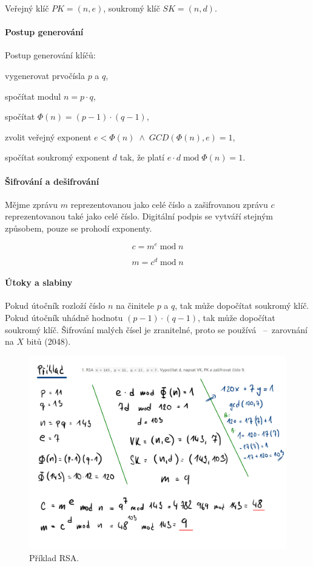 \noindent Veřejný klíč $PK = (n, e)$, soukromý klíč $SK = (n, d)$.

\paragraph*{Postup generování} Postup generování klíčů: \begin{compactenum}
    \item vygenerovat prvočísla $p$ a $q$,
    \item spočítat modul $n = p \cdot q$,
    \item spočítat $\Phi(n) = (p-1) \cdot (q-1)$,
    \item zvolit veřejný exponent $e < \Phi(n) \; \land \;GCD(\Phi(n), e) = 1$,
    \item spočítat soukromý exponent $d$ tak, že platí $e \cdot d \; \text{mod} \; \Phi(n) = 1$.
\end{compactenum}

\paragraph*{Šifrování a dešifrování} Mějme zprávu $m$ reprezentovanou jako celé číslo a zašifrovanou zprávu $c$ reprezentovanou také jako celé číslo. Digitální podpis se vytváří stejným způsobem, pouze se prohodí exponenty.

\begin{equation}
    c = m^e \; \text{mod} \; n
\end{equation}

\begin{equation}
    m = c^d \; \text{mod} \; n
\end{equation}

\paragraph*{Útoky a slabiny} Pokud útočník rozloží číslo $n$ na činitele $p$ a $q$, tak může dopočítat soukromý klíč. Pokud útočník uhádně hodnotu $(p-1) \cdot (q-1)$, tak může dopočítat soukromý klíč. Šifrování malých čísel je zranitelné, proto se používá ~--~zarovnání na $X$ bitů (2048).

\begin{figure}[H]
    \centering
    \includegraphics[width=1\linewidth]{rsa_example.pdf}
    \caption{Příklad RSA.}
\end{figure}

